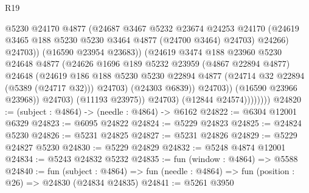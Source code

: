\begin{lexlean}{R19}
\begin{coremodule}
                                  @5230
                                  @24170
                                  @4877
                                  (@24687
                                    @3467
                                    @5232
                                    @23674
                                    @24253
                                    @24170
                                    (@24619
                                      @3465
                                      @188
                                      @5230
                                      @5230
                                      @3464
                                      @4877
                                      (@24700 @3464)
                                      @24703)
                                    @24266)
                                  @24703))
                              (@16590 @23954 @23683))
                            (@24619
                              @3474
                              @188
                              @23960
                              @5230
                              @24648
                              @4877
                              (@24626
                                @1696
                                @189
                                @5232
                                @23959
                                (@4867 @22894 @4877)
                                @24648
                                (@24619
                                  @186
                                  @188
                                  @5230
                                  @5230
                                  @22894
                                  @4877
                                  (@24714 @32 @22894 (@5389 (@24717 @32)))
                                  @24703)
                                (@24303 @6839))
                              @24703))
                          (@16590 @23966 @23968))
                        @24703)
                      (@11193 @23975))
                    @24703)
                  (@12844 @24574))))))))
@24820 := (subject : @4864) -> (needle : @4864) -> @6162
@24822 := @6304 @12001 @6329
@24823 := @6095 @24822
@24824 := @5229 @24823
@24825 := @24824 @5230
@24826 := @5231 @24825
@24827 := @5231 @24826
@24829 := @5229 @24827 @5230
@24830 := @5229 @24829
@24832 := @5248 @4874 @12001
@24834 := @5243 @24832 @5232
@24835 := fun (window : @4864) => @5588
@24840 := fun (subject : @4864) =>
  fun (needle : @4864) => fun (position : @26) => @24830 (@24834 @24835)
@24841 := @5261 @3950

\end{coremodule}
\end{lexlean}
